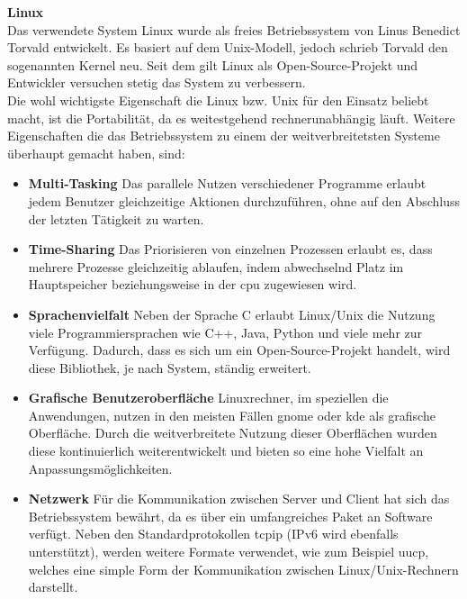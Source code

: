 \textbf{Linux}\\
Das verwendete System Linux wurde als freies Betriebssystem von Linus Benedict Torvald entwickelt.
Es basiert auf dem Unix-Modell, jedoch schrieb Torvald den sogenannten Kernel neu. Seit dem gilt
Linux als Open-Source-Projekt und Entwickler versuchen stetig das System zu verbessern.\cite{linux}\\
Die wohl wichtigste Eigenschaft die Linux bzw. Unix für den Einsatz beliebt macht, ist die Portabilität,
da es weitestgehend rechnerunabhängig läuft. Weitere Eigenschaften die das Betriebssystem zu einem der
 weitverbreitetsten Systeme überhaupt gemacht haben, sind:\cite{linux}\\
\begin{itemize}
\item  \textbf{Multi-Tasking} Das parallele Nutzen verschiedener Programme erlaubt jedem Benutzer
        gleichzeitige Aktionen durchzuführen, ohne auf den Abschluss der letzten Tätigkeit zu warten.
\item  \textbf{Time-Sharing} Das Priorisieren von einzelnen Prozessen erlaubt es, dass mehrere
        Prozesse gleichzeitig ablaufen, indem abwechselnd Platz im Hauptspeicher beziehungsweise in der \ac{cpu}
        zugewiesen wird.
\item \textbf{Sprachenvielfalt} Neben der Sprache C erlaubt Linux/Unix die Nutzung viele Programmiersprachen
      wie C++, Java, Python und viele mehr zur Verfügung. Dadurch, dass es sich um ein Open-Source-Projekt handelt,
      wird diese Bibliothek, je nach System, ständig erweitert.
\item \textbf{Grafische Benutzeroberfläche} Linuxrechner, im speziellen die Anwendungen, nutzen in
      den meisten Fällen \ac{gnome} oder \ac{kde} als grafische Oberfläche. Durch die weitverbreitete Nutzung
      dieser Oberflächen wurden diese kontinuierlich weiterentwickelt und bieten so eine hohe Vielfalt an
      Anpassungsmöglichkeiten.
\item \textbf{Netzwerk} Für die Kommunikation zwischen Server und Client hat sich das Betriebssystem bewährt,
      da es über ein umfangreiches Paket an Software verfügt. Neben den Standardprotokollen \ac{tcpip} (IPv6 wird
      ebenfalls unterstützt), werden weitere Formate verwendet, wie zum Beispiel \ac{uucp}, welches eine simple Form
      der Kommunikation zwischen Linux/Unix-Rechnern darstellt.
\end{itemize}

